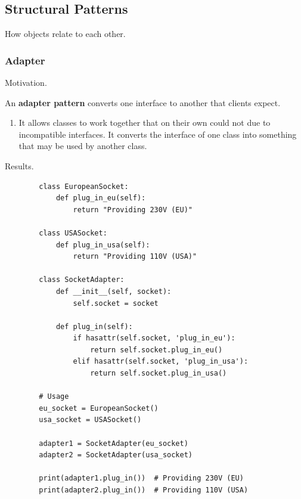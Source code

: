 \subsection{Structural Patterns}

  How objects relate to each other. 

  \subsubsection{Adapter}

    Motivation. 

    \begin{definition}
      \label{def:adapter-pattern}
      An \textbf{adapter pattern} converts one interface to another that clients expect. 
      \begin{enumerate}
        \item It allows classes to work together that on their own could not due to incompatible interfaces. It converts the interface of one class into something that may be used by another class. 
      \end{enumerate}
    \end{definition}

    Results. 

    \begin{example}[Sockets]
      \label{ex:sockets}
      \begin{lstlisting}
        class EuropeanSocket:
            def plug_in_eu(self):
                return "Providing 230V (EU)"

        class USASocket:
            def plug_in_usa(self):
                return "Providing 110V (USA)"

        class SocketAdapter:
            def __init__(self, socket):
                self.socket = socket
            
            def plug_in(self):
                if hasattr(self.socket, 'plug_in_eu'):
                    return self.socket.plug_in_eu()
                elif hasattr(self.socket, 'plug_in_usa'):
                    return self.socket.plug_in_usa()

        # Usage
        eu_socket = EuropeanSocket()
        usa_socket = USASocket()

        adapter1 = SocketAdapter(eu_socket)
        adapter2 = SocketAdapter(usa_socket)

        print(adapter1.plug_in())  # Providing 230V (EU)
        print(adapter2.plug_in())  # Providing 110V (USA) 
      \end{lstlisting}
    \end{example}


